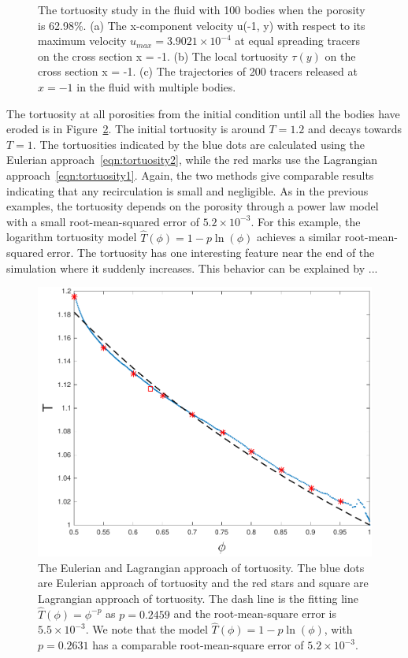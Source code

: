 \documentclass[preprint, 10pt]{elsarticle}
\begin{document}
\begin{figure}[H]
\begin{subfigure}[b]{0.5\textwidth}
\caption{}
\end{subfigure}
\caption{\label{fig:Eroding100tort} The tortuosity study in the fluid
with 100 bodies when the porosity is 62.98\%.  (a) The x-component
velocity u(-1, y) with respect to its maximum velocity $u_{max}=3.9021
\times 10^{-4}$ at equal spreading tracers on the cross section x = -1.
(b) The local tortuosity $\tau(y)$ on the cross section x = -1. (c) The
trajectories of 200 tracers released at $x = -1$ in the fluid with
multiple bodies.}
\end{figure}

The tortuosity at all porosities from the initial condition until all
the bodies have eroded is in Figure~\ref{fig:Eroding100tort_all}.  The
initial tortuosity is around $T=1.2$ and decays towards $T=1$.  The
tortuosities indicated by the blue dots are calculated using the
Eulerian approach~\eqref{eqn:tortuosity2}, while the red marks use the
Lagrangian approach~\eqref{eqn:tortuosity1}.  Again, the two methods
give comparable results indicating that any recirculation is small and
negligible.  As in the previous examples, the tortuosity depends on the
porosity through a power law model with a small root-mean-squared error
of $5.2 \times 10^{-3}$.  For this example, the logarithm tortuosity
model $\hat{T}(\phi) = 1 - p \ln(\phi)$ achieves a similar
root-mean-squared error.  The tortuosity has one interesting feature
near the end of the simulation where it suddenly increases.  This
behavior can be explained by ...  

\begin{figure}[H]
\center
\includegraphics*[width =0.55\linewidth]{./figs/tort_eulerian100}
\caption{\label{fig:Eroding100tort_all} The Eulerian and Lagrangian
approach of tortuosity.  The blue dots are Eulerian approach of
tortuosity and the red stars and square are Lagrangian approach of
tortuosity.  The dash line is the fitting line
$\widehat{T}(\phi)=\phi^{-p}$ as $p=0.2459$ and the root-mean-square
error is $5.5 \times 10^{-3}$.  We note that the model
$\widehat{T}(\phi) = 1-p\ln(\phi)$, with $p=0.2631$ has a comparable
root-mean-square error of $5.2 \times 10^{-3}$.}
\end{figure}
\end{document}
